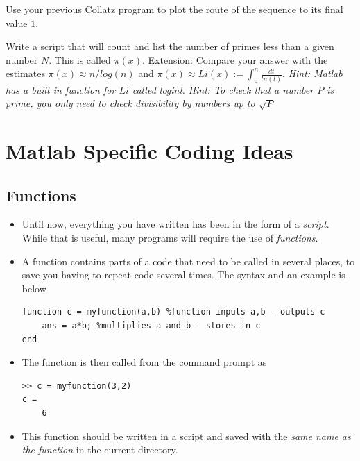 \documentclass[12pt]{report}
\begin{document}
\begin{tcolorbox}[title=Task]
  Use your previous Collatz program to plot the route of the sequence to its final value $1$.
\end{tcolorbox}

\begin{tcolorbox}[title=Task - Difficult]
  Write a script that will count and list the number of primes less than a given number $N$. This is called $\pi(x)$.
  \tcblower
  Extension: Compare your answer with the estimates $\pi(x) \approx n/log(n)$ and $\pi(x) \approx Li(x) := \int_0^n \frac{dt}{ln(t)}$. \textit{Hint: Matlab has a built in function for $Li$ called logint}. \textit{Hint: To check that a number $P$ is prime, you only need to check divisibility by numbers up to $\sqrt{P}$}
\end{tcolorbox}

\clearpage

\section*{Matlab Specific Coding Ideas}

\subsection*{Functions}

\begin{itemize}
\item Until now, everything you have written has been in the form of a \textit{script}. While that is useful, many programs will require the use of \textit{functions}.
\item A function contains parts of a code that need to be called in several places, to save you having to repeat code several times. The syntax and an example is below
\begin{lstlisting}
function c = myfunction(a,b) %function inputs a,b - outputs c
	ans = a*b; %multiplies a and b - stores in c
end
\end{lstlisting}
\item The function is then called from the command prompt as
\begin{lstlisting}
>> c = myfunction(3,2)
c = 
	6
\end{lstlisting}
\item This function should be written in a script and saved with the \textit{same name as the function} in the current directory.
\end{itemize}
\end{document}
